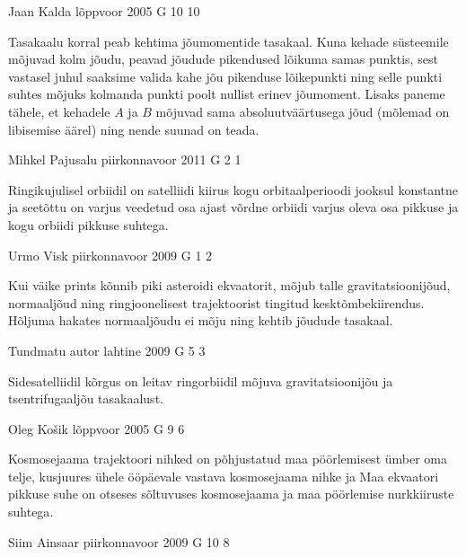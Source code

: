 \documentclass[11pt]{article}
\begin{document}
{%
{Jaan Kalda} %
{lõppvoor} %
{2005} %
{G 10} %
{10} %
{

\ifHint
Tasakaalu korral peab kehtima jõumomentide tasakaal. Kuna kehade süsteemile mõjuvad kolm jõudu, peavad jõudude pikendused lõikuma samas punktis, sest vastasel juhul saaksime valida kahe jõu pikenduse lõikepunkti ning selle punkti suhtes mõjuks kolmanda punkti poolt nullist erinev jõumoment. Lisaks paneme tähele, et kehadele $A$ ja $B$ mõjuvad sama absoluutväärtusega jõud (mõlemad on libisemise äärel) ning nende suunad on teada.
\fi
}

{Mihkel Pajusalu} %
{piirkonnavoor} %
{2011} %
{G 2} %
{1} %
{

\ifHint
Ringikujulisel orbiidil on satelliidi kiirus kogu orbitaalperioodi jooksul konstantne ja seetõttu on varjus veedetud osa ajast võrdne orbiidi varjus oleva osa pikkuse ja kogu orbiidi pikkuse suhtega.
\fi
}

{Urmo Visk} %
{piirkonnavoor} %
{2009} %
{G 1} %
{2} %
{

\ifHint
Kui väike prints kõnnib piki asteroidi ekvaatorit, mõjub talle gravitatsioonijõud, normaaljõud ning ringjoonelisest trajektoorist tingitud kesktõmbekiirendus. Hõljuma hakates normaaljõudu ei mõju ning kehtib jõudude tasakaal.
\fi
}

{Tundmatu autor} %
{lahtine} %
{2009} %
{G 5} %
{3} %
{

\ifHint
Sidesatelliidil kõrgus on leitav ringorbiidil mõjuva gravitatsioonijõu ja tsentrifugaaljõu tasakaalust.
\fi
}

{Oleg Košik} %
{lõppvoor} %
{2005} %
{G 9} %
{6} %
{

\ifHint
Kosmosejaama trajektoori nihked on põhjustatud maa pöörlemisest ümber oma telje, kusjuures ühele ööpäevale vastava kosmosejaama nihke ja Maa ekvaatori pikkuse suhe on otseses sõltuvuses kosmosejaama ja maa pöörlemise nurkkiiruste suhtega.
\fi
}

{Siim Ainsaar} %
{piirkonnavoor} %
{2009} %
{G 10} %
{8} %
{

}}
\end{document}
